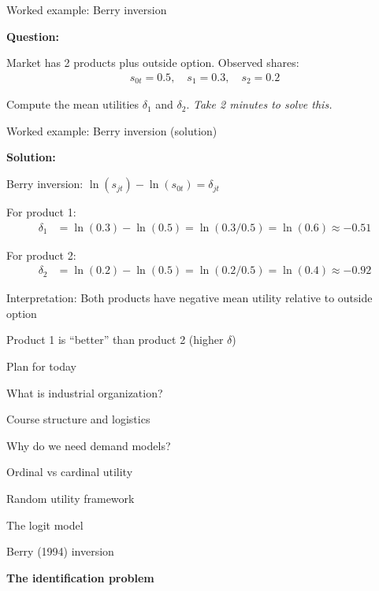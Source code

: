 \documentclass[notes,11pt, aspectratio=169]{beamer}
\newenvironment{wideitemize}{\itemize\addtolength{\itemsep}{10pt}}{\enditemize}
\newenvironment{wideenumerate}{\enumerate\addtolength{\itemsep}{10pt}}{\endenumerate}
\begin{document}
\begin{frame}{Worked example: Berry inversion}
	\begin{wideitemize}
		\item \textbf{Question:}
		\item Market has 2 products plus outside option. Observed shares:
		\begin{align*}
			s_{0t} = 0.5, \quad s_1 = 0.3, \quad s_2 = 0.2
		\end{align*}
		\item Compute the mean utilities $\delta_1$ and $\delta_2$.
	\end{wideitemize}
	\vspace{20pt}
	\centering
	\textit{Take 2 minutes to solve this.}
\end{frame}

\begin{frame}{Worked example: Berry inversion (solution)}
	\begin{wideitemize}
		\item \textbf{Solution:}
		\item Berry inversion: $\ln(s_{jt}) - \ln(s_{0t}) = \delta_{jt}$
		\item For product 1:
		\begin{align*}
			\delta_1 &= \ln(0.3) - \ln(0.5) = \ln(0.3/0.5) = \ln(0.6) \approx -0.51
		\end{align*}
		\item For product 2:
		\begin{align*}
			\delta_2 &= \ln(0.2) - \ln(0.5) = \ln(0.2/0.5) = \ln(0.4) \approx -0.92
		\end{align*}
		\item Interpretation: Both products have negative mean utility relative to outside option
		\item Product 1 is ``better'' than product 2 (higher $\delta$)
	\end{wideitemize}
\end{frame}


\begin{frame}{Plan for today}
  \begin{wideenumerate}
    \item What is industrial organization?
    \item Course structure and logistics
    \item Why do we need demand models?
    \item Ordinal vs cardinal utility
    \item Random utility framework
    \item The logit model
    \item Berry (1994) inversion
    \item \textbf{The identification problem}
  \end{wideenumerate}
\end{frame}
\end{document}

